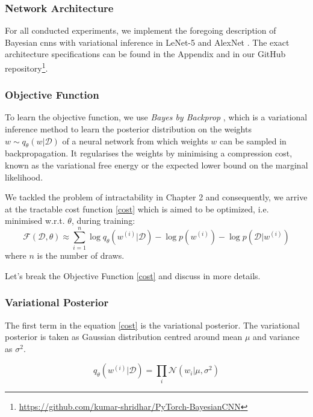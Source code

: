 \subsubsection{Network Architecture}

For all conducted experiments, we implement the foregoing description of Bayesian \acp{cnn} with variational inference in LeNet-5 \cite{lecun1998gradient} and AlexNet \cite{krizhevsky2012imagenet}. The exact architecture specifications can be found in the Appendix and in our GitHub repository\footnote{\url{https://github.com/kumar-shridhar/PyTorch-BayesianCNN}}.

\subsubsection{Objective Function}
To learn the objective function, we use \textit{Bayes by Backprop} \cite{graves2011practical, blundell2015weight}, which is a variational inference method to learn the posterior distribution on the weights $w \sim q_{\theta}(w|\mathcal{D})$ of a neural network from which weights $w$ can be sampled in backpropagation. 
It regularises the weights by minimising a compression cost, known as the variational free energy or the expected lower bound on the marginal likelihood.

 We tackled the problem of intractability in Chapter 2 and consequently, we arrive at the tractable cost function \eqref{cost} which is aimed to be optimized, i.e. minimised w.r.t. $\theta$, during training:
\begin{equation} \label{cost}
    \mathcal{F}(\mathcal{D}, \theta)\approx \sum_{i=1}^n \log q_{\theta}(w^{(i)}|\mathcal{D})-\log p(w^{(i)})-\log p(\mathcal{D}|w^{(i)})
\end{equation}
%
where $n$ is the number of draws.

Let's break the Objective Function \eqref{cost} and discuss in more details. 
\subsubsection{Variational Posterior }

The first term in the equation \eqref{cost} is the variational posterior. The variational posterior is taken as Gaussian distribution centred around mean $\mu$ and variance as $\sigma^2$. 

\begin{equation}
    q_{\theta}(w^{(i)}|\mathcal{D})= \prod_{i} \mathcal{N}(w_{i} | \mu,\sigma^2)
\end{equation}

